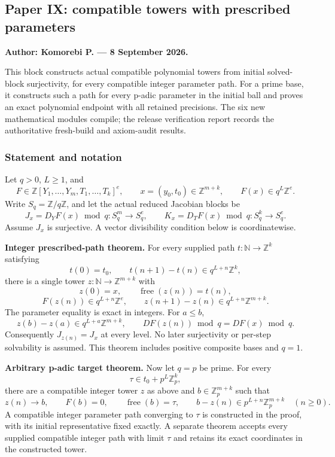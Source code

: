 \hypertarget{cont9:paper-ix-compatible-towers-with-prescribed-parameters}{%
\subsection{Paper IX: compatible towers with prescribed
parameters}\label{cont9:paper-ix-compatible-towers-with-prescribed-parameters}}

\textbf{Author: Komorebi P. --- 8 September 2026.}

This block constructs actual compatible polynomial towers from initial
solved-block surjectivity, for every compatible integer parameter path.
For a prime base, it constructs such a path for every p-adic parameter
in the initial ball and proves an exact polynomial endpoint with all
retained precisions. The six new mathematical modules compile; the
release verification report records the authoritative fresh-build and
axiom-audit results.

\hypertarget{cont9:statement-and-notation}{%
\subsubsection{Statement and notation}\label{cont9:statement-and-notation}}

Let \(q>0\), \(L\ge1\), and \[
F\in\mathbb Z[Y_1,\ldots,Y_m,T_1,\ldots,T_k]^e,
\qquad x=(y_0,t_0)\in\mathbb Z^{m+k},
\qquad F(x)\in q^L\mathbb Z^e.
\] Write \(S_q=\mathbb Z/q\mathbb Z\), and let the actual reduced
Jacobian blocks be \[
J_x=D_YF(x)\bmod q:S_q^m\longrightarrow S_q^e,
\qquad K_x=D_TF(x)\bmod q:S_q^k\longrightarrow S_q^e.
\] Assume \(J_x\) is surjective. A vector divisibility condition below
is coordinatewise.

\textbf{Integer prescribed-path theorem.} For every supplied path
\(t:\mathbb N\to\mathbb Z^k\) satisfying \[
t(0)=t_0,\qquad t(n+1)-t(n)\in q^{L+n}\mathbb Z^k,
\] there is a single tower \(z:\mathbb N\to\mathbb Z^{m+k}\) with \[
z(0)=x,\qquad \operatorname{free}(z(n))=t(n),
\] \[
F(z(n))\in q^{L+n}\mathbb Z^e,\qquad
z(n+1)-z(n)\in q^{L+n}\mathbb Z^{m+k}.
\] The parameter equality is exact in integers. For \(a\le b\), \[
z(b)-z(a)\in q^{L+a}\mathbb Z^{m+k},\qquad
DF(z(n))\bmod q=DF(x)\bmod q.
\] Consequently \(J_{z(n)}=J_x\) at every level. No later surjectivity
or per-step solvability is assumed. This theorem includes positive
composite bases and \(q=1\).

\textbf{Arbitrary p-adic target theorem.} Now let \(q=p\) be prime. For
every \[
\tau\in t_0+p^L\mathbb Z_p^k,
\] there are a compatible integer tower \(z\) as above and
\(b\in\mathbb Z_p^{m+k}\) such that \[
z(n)\longrightarrow b,\qquad F(b)=0,\qquad
\operatorname{free}(b)=\tau,
\qquad b-z(n)\in p^{L+n}\mathbb Z_p^{m+k}\quad(n\ge0).
\] A compatible integer parameter path converging to \(\tau\) is
constructed in the proof, with its initial representative fixed exactly.
A separate theorem accepts every supplied compatible integer path with
limit \(\tau\) and retains its exact coordinates in the constructed
tower.

